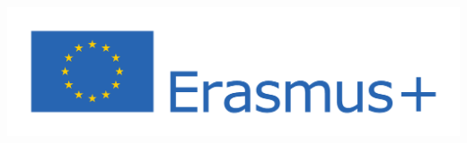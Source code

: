 \vspace{5ex}

\begin{center}
    \includegraphics[width=.7\textwidth]{res/erasmus_plus_logo.pdf}
\end{center}
